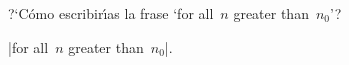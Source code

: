 


\bigskip

\enunciadoS ?`C\'omo escribir\'{\i}as la frase `for all~$n$ greater
than~$n_0$'?

\bigskip

\respuestaS |for all~$n$ greater than~$n_0$|.

\bye

